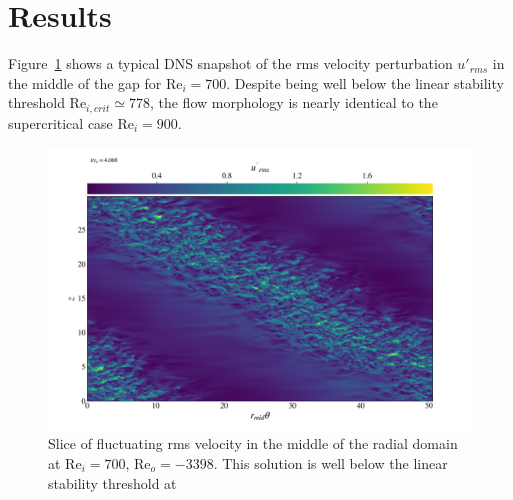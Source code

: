 \documentclass[openacc]{rstransa}%
\newcommand{\Reyn}{\mathrm{Re}}
\begin{document}
\section{Results}
\label{sec:nonlinear}
Figure~\ref{fig:urms_tz_rei700} shows a typical DNS snapshot of the rms velocity perturbation $u'_{rms}$ in the middle of the gap for $\Reyn_i=700$. Despite being well below the linear stability threshold $\Reyn_{i,crit} \simeq 778$, the flow morphology is nearly identical to the supercritical case $\Reyn_i = 900$. 
\begin{figure}
    \centering
    \includegraphics[width=\textwidth]{../figs/urms_tz_rei_700_reo-3398_000278.png}
    \caption{Slice of fluctuating rms velocity in the middle of the radial domain at $\Reyn_i = 700$, $\Reyn_o = -3398$. This solution is well below the linear stability threshold at }
    \label{fig:urms_tz_rei700}
\end{figure}
\end{document}
